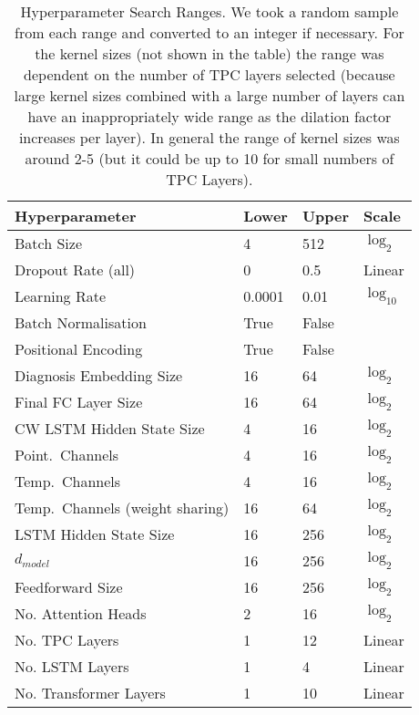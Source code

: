 \documentclass[sigconf]{acmart}
\begin{document}
\begin{table}[h]
  \caption{Hyperparameter Search Ranges. We took a random sample from each range and converted to an integer if necessary. For the kernel sizes (not shown in the table) the range was dependent on the number of TPC layers selected (because large kernel sizes combined with a large number of layers can have an inappropriately wide range as the dilation factor increases per layer). In general the range of kernel sizes was around 2-5 (but it could be up to 10 for small numbers of TPC Layers).}
  \label{tab:hyperparamsearch}
  \small
  \centering
  \begin{tabular}{llll}
    \toprule
    \textbf{Hyperparameter} & \textbf{Lower} & \textbf{Upper} & \textbf{Scale}\\
    \midrule
    Batch Size & 4 & 512 & $\log_2$\\
    Dropout Rate (all) & 0 & 0.5 & Linear\\
    Learning Rate & 0.0001 & 0.01 & $\log_{10}$\\
    Batch Normalisation & True & False & \\
    Positional Encoding & True & False & \\
    Diagnosis Embedding Size & 16 & 64 & $\log_2$\\
    Final FC Layer Size & 16 & 64 & $\log_2$\\
    CW LSTM Hidden State Size & 4 & 16 & $\log_2$\\
    Point.\ Channels & 4 & 16 & $\log_2$\\
    Temp.\ Channels & 4 & 16 & $\log_2$\\
    Temp.\ Channels (weight sharing) & 16 & 64 & $\log_2$\\
    LSTM Hidden State Size & 16 & 256 & $\log_2$\\
    $d_{model}$ & 16 & 256 & $\log_2$\\
    Feedforward Size & 16 & 256 & $\log_2$\\
    No. Attention Heads & 2 & 16 & $\log_2$\\
    No. TPC Layers & 1 & 12 & Linear\\
    No. LSTM Layers & 1 & 4 & Linear\\
    No. Transformer Layers & 1 & 10 & Linear\\
    \bottomrule
  \end{tabular}
\end{table}
\end{document}
